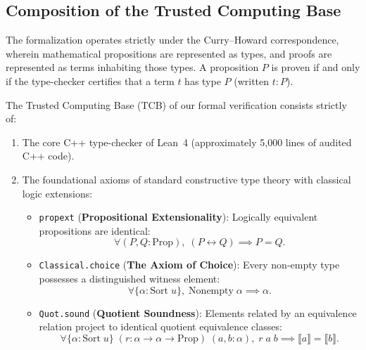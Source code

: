 \subsection{Composition of the Trusted Computing Base}
\label{subsec:tcb_composition}

The formalization operates strictly under the Curry--Howard correspondence, wherein mathematical propositions are represented as types, and proofs are represented as terms inhabiting those types. A proposition $P$ is proven if and only if the type-checker certifies that a term $t$ has type $P$ (written $t : P$).

The Trusted Computing Base (TCB) of our formal verification consists strictly of:
\begin{enumerate}
    \item The core C++ type-checker of Lean~4 (approximately 5,000 lines of audited C++ code).
    \item The foundational axioms of standard constructive type theory with classical logic extensions:
    \begin{itemize}
        \item \texttt{propext} (\textbf{Propositional Extensionality}): Logically equivalent propositions are identical:
        \begin{equation}
        \label{eq:propext_axiom}
        \forall (P, Q : \mathrm{Prop}), \; (P \leftrightarrow Q) \implies P = Q.
        \end{equation}
        \item \texttt{Classical.choice} (\textbf{The Axiom of Choice}): Every non-empty type possesses a distinguished witness element:
        \begin{equation}
        \label{eq:choice_axiom}
        \forall \{\alpha : \mathrm{Sort}\; u\}, \; \mathrm{Nonempty}\; \alpha \implies \alpha.
        \end{equation}
        \item \texttt{Quot.sound} (\textbf{Quotient Soundness}): Elements related by an equivalence relation project to identical quotient equivalence classes:
        \begin{equation}
        \label{eq:quotsound_axiom}
        \forall \{\alpha : \mathrm{Sort}\; u\} \; (r : \alpha \to \alpha \to \mathrm{Prop}) \; (a, b : \alpha), \; r\; a\; b \implies \llbracket a \rrbracket = \llbracket b \rrbracket.
        \end{equation}
    \end{itemize}
\end{enumerate}

